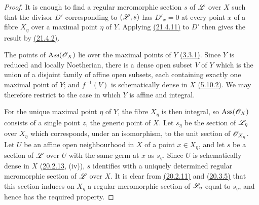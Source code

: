 \begin{proof}
It is enough to find a regular meromorphic section $s$ of $\mathscr{L}$ over
$X$ such that the divisor $D'$ corresponding to $(\mathscr{L},s)$ has
$D'_x=0$ at every point $x$ of a fibre $X_\eta$ over a maximal point
$\eta$ of $Y$.  Applying {\hyperref[IV.21.4.11]{(21.4.11)}} to $D'$ then gives the result by
{\hyperref[IV.21.4.2]{(21.4.2)}}.

The points of $\operatorname{Ass}(\mathscr{O}_X)$ lie over the maximal
points of $Y$ {\hyperref[IV.3.3.1]{(3.3.1)}}.  Since $Y$ is reduced and locally Noetherian,
there is a dense open subset $V$ of $Y$ which is the union of a
disjoint family of affine open subsets, each containing exactly one
maximal point of $Y$; and $f^{-1}(V)$ is schematically dense in $X$
{\hyperref[IV.5.10.2]{(5.10.2)}}.  We may therefore restrict to the case in which $Y$ is
affine and integral.

For the unique maximal point $\eta$ of $Y$, the fibre $X_\eta$ is then
integral, so $\operatorname{Ass}(\mathscr{O}_X)$ consists of a single point
$z$, the generic point of $X$.  Let $s_\eta$ be the section of
$\mathscr{L}_\eta$ over $X_\eta$ which corresponds, under an isomorphism,
to the unit section of $\mathscr{O}_{X_\eta}$.  Let $U$ be an affine open
neighbourhood in $X$ of a point $x\in X_\eta$, and let $s$ be a section
of $\mathscr{L}$ over $U$ with the same germ at $x$ as $s_\eta$.  Since $U$
is schematically dense in $X$ ({\hyperref[IV.20]{20.2.13}}, (iv)), $s$ identifies with a
uniquely determined regular meromorphic section of $\mathscr{L}$ over $X$.
It is clear from {\hyperref[IV.20]{(20.2.11)}} and {\hyperref[IV.20]{(20.3.5)}} that this section induces on
$X_\eta$ a regular meromorphic section of $\mathscr{L}_\eta$ equal to
$s_\eta$, and hence has the required property.
\end{proof}
